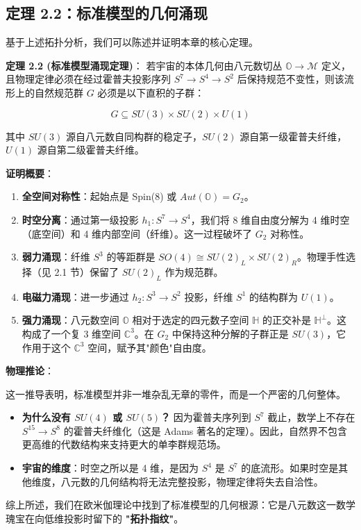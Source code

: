 \subsection{定理 2.2：标准模型的几何涌现}

基于上述拓扑分析，我们可以陈述并证明本章的核心定理。

\textbf{定理 2.2 (标准模型涌现定理)}：
若宇宙的本体几何由八元数切丛 $\mathbb{O} \to \mathcal{M}$ 定义，且物理定律必须在经过霍普夫投影序列 $S^7 \to S^4 \to S^2$ 后保持规范不变性，则该流形上的自然规范群 $G$ 必须是以下直积的子群：

\[G \subseteq SU(3) \times SU(2) \times U(1)\]

其中 $SU(3)$ 源自八元数自同构群的稳定子，$SU(2)$ 源自第一级霍普夫纤维，$U(1)$ 源自第二级霍普夫纤维。

\textbf{证明概要}：

\begin{enumerate}
\item \textbf{全空间对称性}：起始点是 Spin(8) 或 $Aut(\mathbb{O}) = G_2$。
\item \textbf{时空分离}：通过第一级投影 $h_1: S^7 \to S^4$，我们将 8 维自由度分解为 4 维时空（底空间）和 4 维内部空间（纤维）。这一过程破坏了 $G_2$ 对称性。
\item \textbf{弱力涌现}：纤维 $S^3$ 的等距群是 $SO(4) \cong SU(2)_L \times SU(2)_R$。物理手性选择（见 2.1 节）保留了 $SU(2)_L$ 作为规范群。
\item \textbf{电磁力涌现}：进一步通过 $h_2: S^3 \to S^2$ 投影，纤维 $S^1$ 的结构群为 $U(1)$。
\item \textbf{强力涌现}：八元数空间 $\mathbb{O}$ 相对于选定的四元数子空间 $\mathbb{H}$ 的正交补是 $\mathbb{H}^\perp$。这构成了一个复 3 维空间 $\mathbb{C}^3$。在 $G_2$ 中保持这种分解的子群正是 $SU(3)$，它作用于这个 $\mathbb{C}^3$ 空间，赋予其"颜色"自由度。
\end{enumerate}

\textbf{物理推论}：

这一推导表明，标准模型并非一堆杂乱无章的零件，而是一个严密的几何整体。

\begin{itemize}
\item \textbf{为什么没有 $SU(4)$ 或 $SU(5)$？} 因为霍普夫序列到 $S^7$ 截止，数学上不存在 $S^{15} \to S^8$ 的霍普夫纤维化（这是 Adams 著名的定理）。因此，自然界不包含更高维的代数结构来支持更大的单李群规范场。
\item \textbf{宇宙的维度}：时空之所以是 4 维，是因为 $S^4$ 是 $S^7$ 的底流形。如果时空是其他维度，八元数的几何结构将无法完整投影，物理定律将失去自洽性。
\end{itemize}

综上所述，我们在欧米伽理论中找到了标准模型的几何根源：它是八元数这一数学瑰宝在向低维投影时留下的 \textbf{"拓扑指纹"}。
